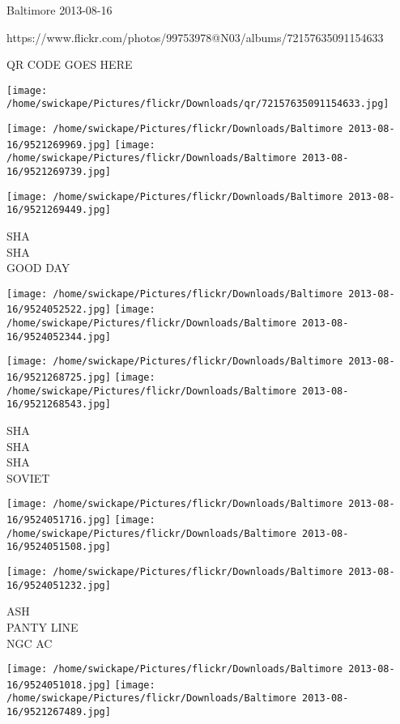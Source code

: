 \documentclass[10pt,letterpaper]{article}
\begin{document}
Baltimore 2013-08-16

https://www.flickr.com/photos/99753978@N03/albums/72157635091154633

QR CODE GOES HERE

\texttt{[image: /home/swickape/Pictures/flickr/Downloads/qr/72157635091154633.jpg]}
\pagebreak

\texttt{[image: /home/swickape/Pictures/flickr/Downloads/Baltimore 2013-08-16/9521269969.jpg]}
\texttt{[image: /home/swickape/Pictures/flickr/Downloads/Baltimore 2013-08-16/9521269739.jpg]}

\vspace{0.25in}
\texttt{[image: /home/swickape/Pictures/flickr/Downloads/Baltimore 2013-08-16/9521269449.jpg]}

SHA\\
SHA\\
GOOD DAY\\
\pagebreak

\texttt{[image: /home/swickape/Pictures/flickr/Downloads/Baltimore 2013-08-16/9524052522.jpg]}
\texttt{[image: /home/swickape/Pictures/flickr/Downloads/Baltimore 2013-08-16/9524052344.jpg]}

\texttt{[image: /home/swickape/Pictures/flickr/Downloads/Baltimore 2013-08-16/9521268725.jpg]}
\texttt{[image: /home/swickape/Pictures/flickr/Downloads/Baltimore 2013-08-16/9521268543.jpg]}

SHA\\
SHA\\
SHA\\
SOVIET\\
\pagebreak

\texttt{[image: /home/swickape/Pictures/flickr/Downloads/Baltimore 2013-08-16/9524051716.jpg]}
\texttt{[image: /home/swickape/Pictures/flickr/Downloads/Baltimore 2013-08-16/9524051508.jpg]}

\vspace{0.25in}
\texttt{[image: /home/swickape/Pictures/flickr/Downloads/Baltimore 2013-08-16/9524051232.jpg]}

ASH\\
PANTY LINE\\
NGC AC\\
\pagebreak

\texttt{[image: /home/swickape/Pictures/flickr/Downloads/Baltimore 2013-08-16/9524051018.jpg]}
\texttt{[image: /home/swickape/Pictures/flickr/Downloads/Baltimore 2013-08-16/9521267489.jpg]}
\end{document}
